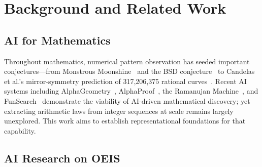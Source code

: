 
\section{Background and Related Work}
\label{sec:background}

\subsection{AI for Mathematics}
\label{sec:background:ai-math}

Throughout mathematics, numerical pattern observation has seeded important
conjectures---from Monstrous Moonshine~\cite{conway1979monstrous} and the
BSD conjecture~\cite{birch1965} to Candelas et al.'s mirror-symmetry prediction of 317,206,375
rational curves~\cite{candelas1991}.
Recent AI systems including AlphaGeometry~\cite{trinh2024alphageometry},
AlphaProof~\cite{alphaproof2024}, the Ramanujan Machine~\cite{raayoni2021ramanujan}, and
FunSearch~\cite{romera2023funsearch} demonstrate the viability of AI-driven mathematical
discovery; yet extracting arithmetic laws from integer sequences at scale remains largely
unexplored. This work aims to establish representational foundations for that capability.

\subsection{AI Research on OEIS}
\label{sec:background:oeis}


